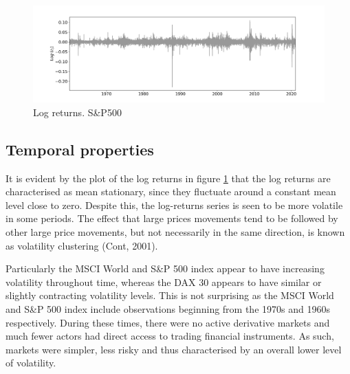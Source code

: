 \begin{figure}[H] 
    \centering
    \includegraphics[width=1\textwidth]{analysis/data_description/images/SP500_log_returns.png}
    \caption{Log returns. S\&P500}
    \label{fig: log_returns_all_indices}
\end{figure}

\label{subsection: distributional properties}

\subsection{Temporal properties}
\label{subsection: temporal properties}
It is evident by the plot of the log returns in figure \ref{fig: log_returns_all_indices} that the log returns are characterised as mean stationary, since they fluctuate around a constant mean level close to zero. Despite this, the log-returns series is seen to be more volatile in some periods. The effect that large prices movements tend to be followed by other large price movements, but not necessarily in the same direction, is known as volatility clustering (Cont, 2001). 

Particularly the MSCI World and S\&P 500 index appear to have increasing volatility throughout time, whereas the DAX 30 appears to have similar or slightly contracting volatility levels. This is not surprising as the MSCI World and S\&P 500 index include observations beginning from the 1970s and 1960s respectively. During these times, there were no active derivative markets and much fewer actors had direct access to trading financial instruments. As such, markets were simpler, less risky and thus characterised by an overall lower level of volatility. 

